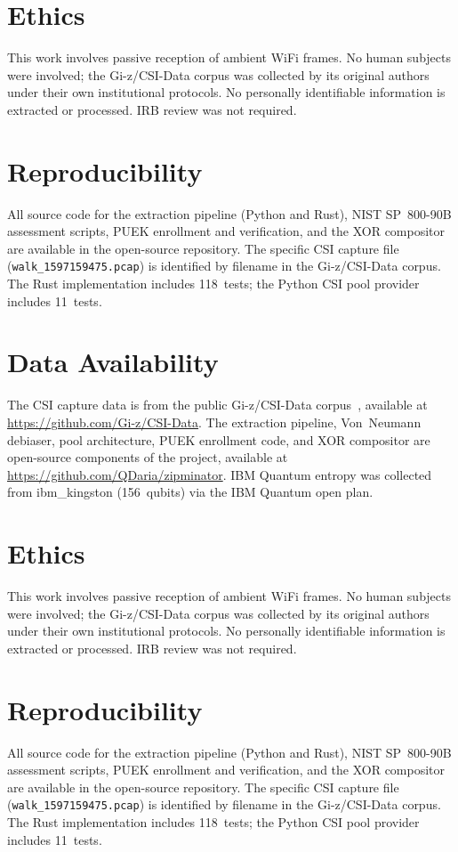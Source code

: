 \section*{Ethics}
This work involves passive reception of ambient WiFi frames.
No human subjects were involved; the Gi-z/CSI-Data corpus was collected by its original authors under their own institutional protocols.
No personally identifiable information is extracted or processed.
IRB review was not required.

\section*{Reproducibility}
All source code for the extraction pipeline (Python and Rust), NIST SP~800-90B assessment scripts, PUEK enrollment and verification, and the XOR compositor are available in the open-source repository.
The specific CSI capture file (\texttt{walk\_1597159475.pcap}) is identified by filename in the Gi-z/CSI-Data corpus.
The Rust implementation includes 118~tests; the Python CSI pool provider includes 11~tests.


\section*{Data Availability}
The CSI capture data is from the public Gi-z/CSI-Data corpus~\cite{gringoli2019csidata}, available at \url{https://github.com/Gi-z/CSI-Data}.
The extraction pipeline, Von~Neumann debiaser, pool architecture, PUEK enrollment code, and XOR compositor are open-source components of the \zipminator project, available at \url{https://github.com/QDaria/zipminator}.
IBM Quantum entropy was collected from ibm\_kingston (156~qubits) via the IBM Quantum open plan.

\section*{Ethics}
This work involves passive reception of ambient WiFi frames.
No human subjects were involved; the Gi-z/CSI-Data corpus was collected by its original authors under their own institutional protocols.
No personally identifiable information is extracted or processed.
IRB review was not required.

\section*{Reproducibility}
All source code for the extraction pipeline (Python and Rust), NIST SP~800-90B assessment scripts, PUEK enrollment and verification, and the XOR compositor are available in the open-source repository.
The specific CSI capture file (\texttt{walk\_1597159475.pcap}) is identified by filename in the Gi-z/CSI-Data corpus.
The Rust implementation includes 118~tests; the Python CSI pool provider includes 11~tests.
